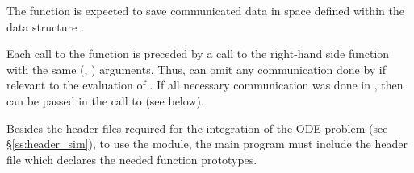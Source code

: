 {
  The  function is expected to save communicated data in space defined
  within the data structure .

  Each call to the  function is preceded by a call to the right-hand side
  function  with the same (, ) arguments.  Thus,  can omit
  any communication done by  if relevant to the evaluation of .
  If all necessary communication was done in , then 
  can be passed in the call to  (see below).
}

Besides the header files required for the integration of the ODE problem
(see \S\ref{ss:header_sim}),  to use the {\cvbbdpre} module, the main program
must include the header file  which declares the needed
function prototypes.

